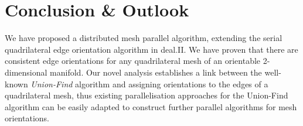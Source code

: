 \documentclass[oneeqnum,onethmnum,onefignum,onetabnum]{siamltex1213}
\begin{document}
\section{Conclusion \& Outlook}
\label{sec:conclusion}

We have proposed a distributed mesh parallel algorithm, extending the
serial quadrilateral edge orientation algorithm in deal.II.
We have proven that there are consistent edge orientations for any
quadrilateral mesh of an orientable 2-dimensional manifold.
Our novel analysis establishes a link between the well-known
\emph{Union-Find} algorithm and assigning orientations to the edges of
a quadrilateral mesh, thus existing parallelisation approaches for
the Union-Find algorithm can be easily adapted to construct further
parallel algorithms for mesh orientations.


\end{document}
